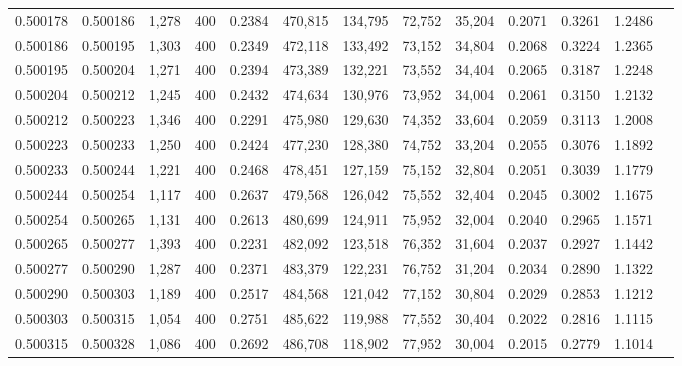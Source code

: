 \begin{tabular}{rrrrrrrrrrrrr}
0.500178 & 0.500186 & 1,278 & 400 &                                     0.2384 & 470,815 & 134,795 &  72,752 &  35,204 & 0.2071 & 0.3261 & 1.2486 \\
0.500186 & 0.500195 & 1,303 & 400 &                                     0.2349 & 472,118 & 133,492 &  73,152 &  34,804 & 0.2068 & 0.3224 & 1.2365 \\
0.500195 & 0.500204 & 1,271 & 400 &                                     0.2394 & 473,389 & 132,221 &  73,552 &  34,404 & 0.2065 & 0.3187 & 1.2248 \\
0.500204 & 0.500212 & 1,245 & 400 &                                     0.2432 & 474,634 & 130,976 &  73,952 &  34,004 & 0.2061 & 0.3150 & 1.2132 \\
0.500212 & 0.500223 & 1,346 & 400 &                                     0.2291 & 475,980 & 129,630 &  74,352 &  33,604 & 0.2059 & 0.3113 & 1.2008 \\
0.500223 & 0.500233 & 1,250 & 400 &                                     0.2424 & 477,230 & 128,380 &  74,752 &  33,204 & 0.2055 & 0.3076 & 1.1892 \\
0.500233 & 0.500244 & 1,221 & 400 &                                     0.2468 & 478,451 & 127,159 &  75,152 &  32,804 & 0.2051 & 0.3039 & 1.1779 \\
0.500244 & 0.500254 & 1,117 & 400 &                                     0.2637 & 479,568 & 126,042 &  75,552 &  32,404 & 0.2045 & 0.3002 & 1.1675 \\
0.500254 & 0.500265 & 1,131 & 400 &                                     0.2613 & 480,699 & 124,911 &  75,952 &  32,004 & 0.2040 & 0.2965 & 1.1571 \\
0.500265 & 0.500277 & 1,393 & 400 &                                     0.2231 & 482,092 & 123,518 &  76,352 &  31,604 & 0.2037 & 0.2927 & 1.1442 \\
0.500277 & 0.500290 & 1,287 & 400 &                                     0.2371 & 483,379 & 122,231 &  76,752 &  31,204 & 0.2034 & 0.2890 & 1.1322 \\
0.500290 & 0.500303 & 1,189 & 400 &                                     0.2517 & 484,568 & 121,042 &  77,152 &  30,804 & 0.2029 & 0.2853 & 1.1212 \\
0.500303 & 0.500315 & 1,054 & 400 &                                     0.2751 & 485,622 & 119,988 &  77,552 &  30,404 & 0.2022 & 0.2816 & 1.1115 \\
0.500315 & 0.500328 & 1,086 & 400 &                                     0.2692 & 486,708 & 118,902 &  77,952 &  30,004 & 0.2015 & 0.2779 & 1.1014 \\

\end{tabular}
